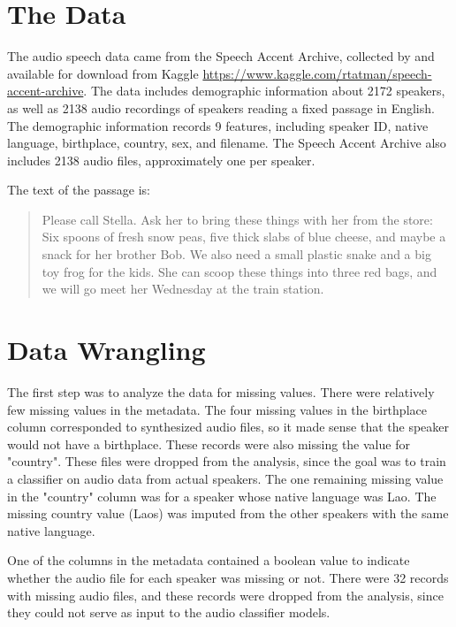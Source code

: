 \section{The Data}

The audio speech data came from the Speech Accent Archive, collected by \cite{AccentArchive} and available for download from Kaggle \url{https://www.kaggle.com/rtatman/speech-accent-archive}. The data includes demographic information about 2172 speakers, as well as 2138 audio recordings of speakers reading a fixed passage in English.  The demographic information records 9 features, including speaker ID, native language, birthplace, country, sex, and filename. The Speech Accent Archive also includes 2138 audio files, approximately one per speaker.

The text of the passage is: 
\begin{quotation}
Please call Stella.  Ask her to bring these things with her from the store:  Six spoons of fresh snow peas, five thick slabs of blue cheese, and maybe a snack for her brother Bob.  We also need a small plastic snake and a big toy frog for the kids.  She can scoop these things into three red bags, and we will go meet her Wednesday at the train station. \cite{AccentArchive}
\end{quotation}

\section{Data Wrangling}

The first step was to analyze the data for missing values. There were relatively few missing values in the metadata.  The four missing values in the birthplace column corresponded to synthesized audio files, so it made sense that the speaker would not have a birthplace. These records were also missing the value for "country". These files were dropped from the analysis, since the goal was to train a classifier on audio data from actual speakers. The one remaining missing value in the "country" column was for a speaker whose native language was Lao. The missing country value (Laos) was imputed from the other speakers with the same native language.

One of the columns in the metadata contained a boolean value to indicate whether the audio file for each speaker was missing or not. There were 32 records with missing audio files, and these records were dropped from the analysis, since they could not serve as input to the audio classifier models.

